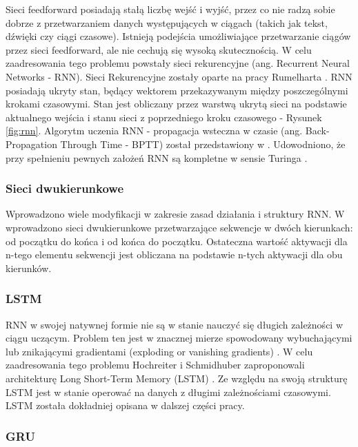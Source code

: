 \documentclass[oneside, mag]{mgr}
\begin{document}
Sieci feedforward posiadają stałą liczbę wejść i wyjść, przez co nie radzą sobie dobrze z przetwarzaniem danych występujących w ciągach (takich jak tekst, dźwięki czy ciągi czasowe). Istnieją podejścia umożliwiające przetwarzanie ciągów przez sieci feedforward, ale nie cechują się wysoką skutecznością. W celu zaadresowania tego problemu powstały sieci rekurencyjne (ang. Recurrent Neural Networks - RNN).
Sieci Rekurencyjne zostały oparte na pracy Rumelharta \cite{RNN}. RNN posiadają ukryty stan, będący wektorem przekazywanym między poszczególnymi krokami czasowymi. Stan jest obliczany przez warstwą ukrytą sieci na podstawie aktualnego wejścia i stanu sieci z poprzedniego kroku czasowego - Rysunek \ref{fig:rnn}.
Algorytm uczenia RNN - propagacja wsteczna w czasie (ang. Back-Propagation Through Time - BPTT) został przedstawiony w \cite{BPTT}.
Udowodniono, że przy spełnieniu pewnych założeń RNN są kompletne w sensie Turinga \cite{turing-complete}.

\subsubsection{Sieci dwukierunkowe}

Wprowadzono wiele modyfikacji w zakresie zasad działania i struktury RNN. 
W \cite{bidirectional} wprowadzono sieci dwukierunkowe przetwarzające sekwencje w dwóch kierunkach: od początku do końca i od końca do początku. Ostateczna wartość aktywacji dla n-tego elementu sekwencji jest obliczana na podstawie n-tych aktywacji dla obu kierunków.

\subsubsection{LSTM}

RNN w swojej natywnej formie nie są w stanie nauczyć się długich zależności w ciągu uczącym. Problem ten jest w znacznej mierze spowodowany wybuchającymi lub znikającymi gradientami (exploding or vanishing gradients) \cite{vanishing_gradient_RNN}. W celu zaadresowania tego problemu Hochreiter i Schmidhuber zaproponowali architekturę Long Short-Term Memory (LSTM) \cite{LSTM}. Ze względu na swoją strukturę LSTM jest w stanie operować na danych z długimi zależnościami czasowymi. LSTM została dokładniej opisana w dalszej części pracy. 

\subsubsection{GRU}
\end{document}
